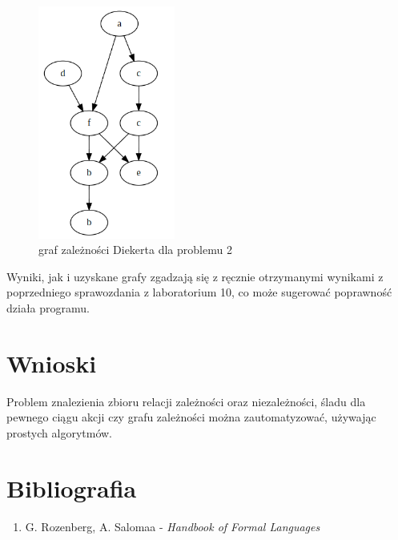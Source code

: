 \documentclass{article}
\begin{document}
\begin{figure}[H]
    \centering
    \includegraphics[width=0.4\textwidth]{graph_2.png}
    \caption{graf zależności Diekerta dla problemu 2}
\end{figure}

Wyniki, jak i uzyskane grafy zgadzają się z ręcznie otrzymanymi wynikami z poprzedniego
sprawozdania z laboratorium 10, co może sugerować poprawność działa programu.

\section{Wnioski}
Problem znalezienia zbioru relacji zależności oraz niezależności, śladu dla pewnego
ciągu akcji czy grafu zależności można zautomatyzować, używając prostych algorytmów. 

\section{Bibliografia}

\begin{enumerate}
    \item G. Rozenberg, A. Salomaa - \textit{Handbook of Formal Languages}
\end{enumerate}
\end{document}
